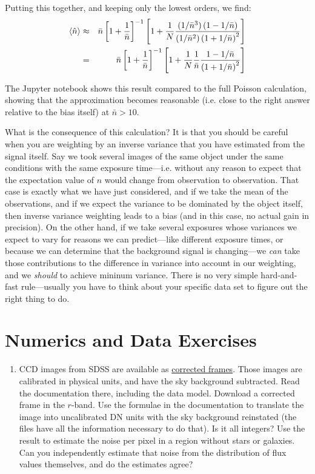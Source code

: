 \begin{enumerate}
\begin{answer}
Putting this together, and keeping only the lowest orders, we find:
\begin{eqnarray}
 \langle \hat n \rangle &\approx&
\bar n \left[ 1 + \frac{1}{\bar n}\right]^{-1}
\left[ 1 + \frac{1}{N} \frac{(1/\bar n^3) \left(1 - 1 / \bar n\right)}
{(1/\bar n^2) \left(1 + 1/\bar n\right)^2} \right] \cr
 &=&
\bar n \left[ 1 + \frac{1}{\bar n}\right]^{-1}
\left[ 1 + \frac{1}{N} \frac{1}{\bar n} \frac{1 - 1 / \bar n}
{\left(1 + 1/\bar n\right)^2} \right]
\end{eqnarray}

The Jupyter notebook shows this result compared to the full Poisson
calculation, showing that the approximation becomes reasonable
(i.e. close to the right answer relative to the bias itself) at ${\bar
n} > 10$.

What is the consequence of this calculation? It is that you should be
careful when you are weighting by an inverse variance that you have
estimated from the signal itself. Say we took several images of the
same object under the same conditions with the same exposure
time---i.e. without any reason to expect that the expectation value of
$n$ would change from observation to observation. That case is exactly
what we have just considered, and if we take the mean of the
observations, and if we expect the variance to be dominated by the
object itself, then inverse variance weighting leads to a bias (and
in this case, no actual gain in precision).
On the other hand, if we
take several exposures whose variances we expect to vary for reasons
we can predict---like different exposure times, or because we can
determine that the background signal is changing---we {\it can} 
take those contributions to the difference in variance into account
in our weighting, and we {\it should} to achieve mininum variance.
There is no very simple hard-and-fast rule---usually you have to think
about your specific data set to figure out the right thing to do.
\end{answer}
\end{enumerate}

\section{Numerics and Data Exercises}

\begin{enumerate}
\item CCD images from SDSS are available
as \href{https://www.sdss.org/dr14/imaging/images/#corr}{corrected
frames}. Those images are calibrated in physical units, and have the
sky background subtracted. Read the documentation there, including the
data model. Download a corrected frame in the $r$-band. Use the
formulae in the documentation to translate the image into uncalibrated
DN units with the sky background reinstated (the files have all the
information necessary to do that). Is it all integers?  Use the result
to estimate the noise per pixel in a region without stars or
galaxies. Can you independently estimate that noise from the
distribution of flux values themselves, and do the estimates agree?
\end{enumerate}


  
